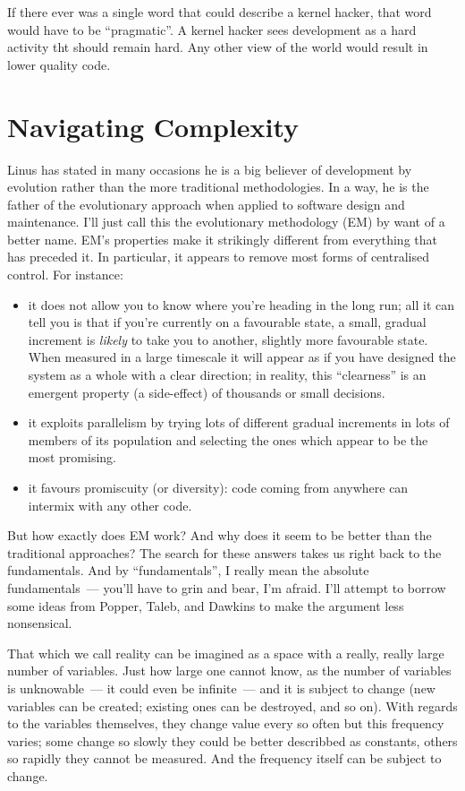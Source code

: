 \documentclass{book}
\begin{document}
If there ever was a single word that could describe a kernel hacker,
that word would have to be ``pragmatic''. A kernel hacker sees
development as a hard activity tht should remain hard. Any other view
of the world would result in lower quality code.

\section{Navigating Complexity}

Linus has stated in many occasions he is a big believer of development
by evolution rather than the more traditional methodologies. In a way,
he is the father of the evolutionary approach when applied to software
design and maintenance. I'll just call this the evolutionary
methodology (EM) by want of a better name. EM's properties make it
strikingly different from everything that has preceded it. In
particular, it appears to remove most forms of centralised
control. For instance:

\begin{itemize}
\item it does not allow you to know where you're heading in the long
  run; all it can tell you is that if you're currently on a favourable
  state, a small, gradual increment is \emph{likely} to take you to
  another, slightly more favourable state. When measured in a large
  timescale it will appear as if you have designed the system as a
  whole with a clear direction; in reality, this ``clearness'' is an
  emergent property (a side-effect) of thousands or small decisions.
\item it exploits parallelism by trying lots of different gradual
  increments in lots of members of its population and selecting the
  ones which appear to be the most promising.
\item it favours promiscuity (or diversity): code coming from anywhere
  can intermix with any other code.
\end{itemize}

But how exactly does EM work? And why does it seem to be better than
the traditional approaches? The search for these answers takes us
right back to the fundamentals. And by ``fundamentals'', I really mean
the absolute fundamentals~--- you'll have to grin and bear, I'm
afraid. I'll attempt to borrow some ideas from Popper, Taleb, and
Dawkins to make the argument less nonsensical.

That which we call reality can be imagined as a space with a really,
really large number of variables. Just how large one cannot know, as
the number of variables is unknowable~--- it could even be infinite~---
and it is subject to change (new variables can be created; existing
ones can be destroyed, and so on). With regards to the variables
themselves, they change value every so often but this frequency
varies; some change so slowly they could be better describbed as
constants, others so rapidly they cannot be measured. And the
frequency itself can be subject to change.
\end{document}
